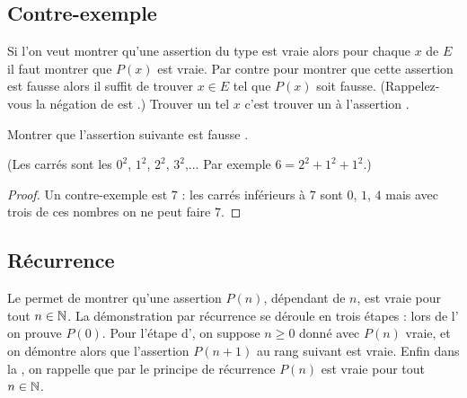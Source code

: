 \documentclass[11pt,class=report,crop=false]{standalone}
\begin{document}
\subsection{Contre-exemple}

Si l'on veut montrer qu'une assertion du type  est vraie
alors pour chaque $x$ de $E$ il faut montrer que $P(x)$ est vraie. Par contre
pour montrer que cette assertion est fausse alors il suffit de trouver $x \in E$ tel que $P(x)$
 soit fausse. (Rappelez-vous la négation de 
est .)
Trouver un tel $x$ c'est trouver un  à l'assertion .

\begin{exemple}
Montrer que l'assertion suivante est fausse .

(Les carrés sont les $0^2$, $1^2$, $2^2$, $3^2$,... Par exemple
$6 = 2^2+1^2+1^2$.)

\begin{proof}
Un contre-exemple est $7$ : les carrés inférieurs à $7$ sont $0$, $1$, $4$
mais avec trois de ces nombres on ne peut faire $7$.
\end{proof}
\end{exemple}



\subsection{Récurrence}

Le  permet de montrer qu'une assertion $P(n)$, dépendant de $n$,
est vraie pour tout $n \in \mathbb{N}$.
La démonstration par récurrence se déroule en trois étapes : lors de l' on prouve $P(0)$.
Pour l'étape d', on suppose $n\ge 0$ donné avec $P(n)$ vraie,
et on démontre alors que l'assertion  $P(n+1)$ au rang suivant est vraie.
Enfin dans la , on rappelle que par le principe de récurrence $P(n)$ est vraie pour tout $n\in\mathbb{N}$.
\end{document}
